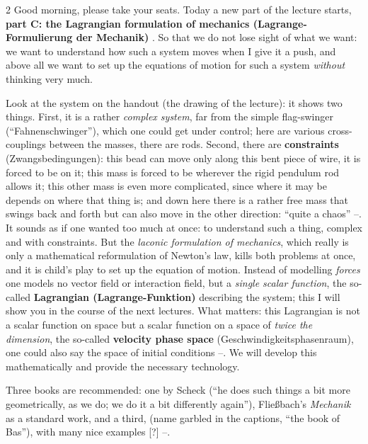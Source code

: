 \begin{paracol}{2}
Good morning, please take your seats. Today a new part of the lecture starts, \textbf{part C: the Lagrangian formulation of mechanics (Lagrange-Formulierung der Mechanik)} . So that we do not lose sight of what we want: we want to understand how such a system moves when I give it a push, and above all we want to set up the equations of motion for such a system \emph{without} thinking very much.

Look at the system on the handout (the drawing of the lecture): it shows two things. First, it is a rather \emph{complex system}, far from the simple flag-swinger (``Fahnenschwinger''), which one could get under control; here are various cross-couplings between the masses, there are rods. Second, there are \textbf{constraints} (Zwangsbedingungen): this bead can move only along this bent piece of wire, it is forced to be on it; this mass is forced to be wherever the rigid pendulum rod allows it;
this other mass is even more complicated, since where it may be depends on where that thing is; and down here there is a rather free mass that swings back and forth but can also move in the other direction: ``quite a chaos'' --.
It sounds as if one wanted too much at once: to understand such a thing, complex and with constraints. But the \emph{laconic formulation of mechanics}, which really is only a mathematical reformulation of Newton's law, kills both problems at once, and it is child's play to set up the equation of motion. Instead of modelling \emph{forces} one models no vector field or interaction field,
but a \emph{single scalar function}, the so-called \textbf{Lagrangian (Lagrange-Funktion)} describing the system; this I will show you in the course of the next lectures. What matters: this Lagrangian is not a scalar function on space but a scalar function on a space of \emph{twice the dimension}, the so-called \textbf{velocity phase space} (Geschwindigkeitsphasenraum), one could also say the space of initial conditions --.
We will develop this mathematically and provide the necessary technology.

\begin{coursenote}\label{cn:lag-books}
Three books are recommended: one by Scheck (``he does such things a bit more geometrically, as we do; we do it a bit differently again''), Flie{\ss}bach's \emph{Mechanik} as a standard work, and a third, (name garbled in the captions, ``the book of Bas''), with many nice examples [?] --.
\end{coursenote}


\end{paracol}
